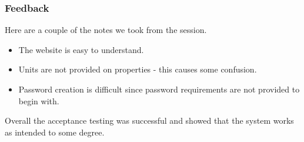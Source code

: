 \subsubsection{Feedback}
Here are a couple of the notes we took from the session.
\begin{itemize}
	\item The website is easy to understand.
	\item Units are not provided on properties - this causes some confusion.
	\item Password creation is difficult since password requirements are not provided to begin with.
\end{itemize}
Overall the acceptance testing was successful and showed that the system works as intended to some degree.